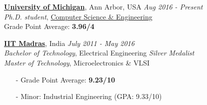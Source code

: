\documentclass[line,margin,letter]{resume}
\begin{document}
\begin{resume}
    \href{http://www.umich.edu}{\textbf{University of Michigan}}, Ann Arbor, USA \hfill \emph{Aug 2016 - Present} \\ 
    \phantom{x}\hspace{3ex} \emph{Ph.D. student}, \href{http://www.cse.umich.edu}{Computer Science \& Engineering} \\
    \phantom{x}\hspace{3ex} Grade Point Average: \textbf{3.96/4}

    \vspace{-0.2cm}
    \href{http://www.iitm.ac.in}{\textbf{IIT Madras}}, India \hfill \emph{July 2011 - May 2016} \\ 
    \phantom{xx}\hspace{3ex} \emph{Bachelor of Technology}, Electrical Engineering \hfill \textit{Silver Medalist} \\
    \phantom{xx}\hspace{3ex} \emph{Master of Technology}, Microelectronics \& VLSI
    
    \vspace{-0.2cm}
    \begin{itemize}[leftmargin=1.25cm]
        \item[-] Grade Point Average: \textbf{9.23/10}
        \item[-] Minor: Industrial Engineering (GPA: 9.33/10)
    \end{itemize}

    

\end{resume}
\end{document}
